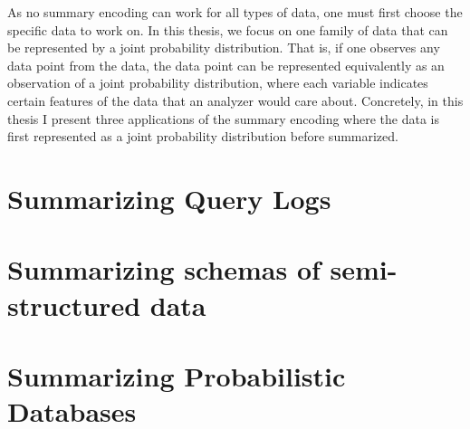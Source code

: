 As no summary encoding can work for all types of data, one must first choose the specific data to work on. 
In this thesis, we focus on one family of data that can be represented by a joint probability distribution.
That is, if one observes any data point from the data, the data point can be represented equivalently as an observation of a joint probability distribution, where each variable indicates certain features of the data that an analyzer would care about.
Concretely, in this thesis I present three applications of the summary encoding where the data is first represented as a joint probability distribution before summarized. 
 
\section{Summarizing Query Logs}
\section{Summarizing schemas of semi-structured data}
\section{Summarizing Probabilistic Databases}